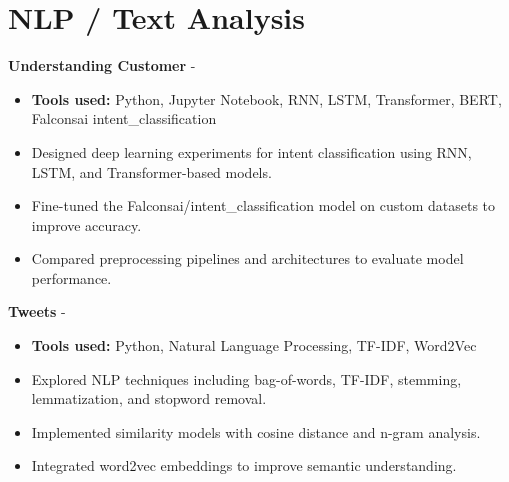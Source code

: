 \documentclass[a4paper,11pt]{article}%
\begin{document}
\section*{NLP / Text Analysis}%
%
\noindent \textbf{Understanding Customer} - \href{https://github.com/sboof911/Understanding-customer}{{}}%
\begin{itemize}[leftmargin=2em,label={},parsep=0pt,topsep=1em]%
\item \textbf{Tools used:} Python, Jupyter Notebook, RNN, LSTM, Transformer, BERT, Falconsai intent\_classification%
\item Designed deep learning experiments for intent classification using RNN, LSTM, and Transformer-based models.%
\item Fine-tuned the Falconsai/intent\_classification model on custom datasets to improve accuracy.%
\item Compared preprocessing pipelines and architectures to evaluate model performance.%
\end{itemize}%
%
\noindent \textbf{Tweets} - \href{https://github.com/sboof911/tweets}{{}}%
\begin{itemize}[leftmargin=2em,label={},parsep=0pt,topsep=1em]%
\item \textbf{Tools used:} Python, Natural Language Processing, TF-IDF, Word2Vec%
\item Explored NLP techniques including bag-of-words, TF-IDF, stemming, lemmatization, and stopword removal.%
\item Implemented similarity models with cosine distance and n-gram analysis.%
\item Integrated word2vec embeddings to improve semantic understanding.%
\end{itemize}%
\end{document}
